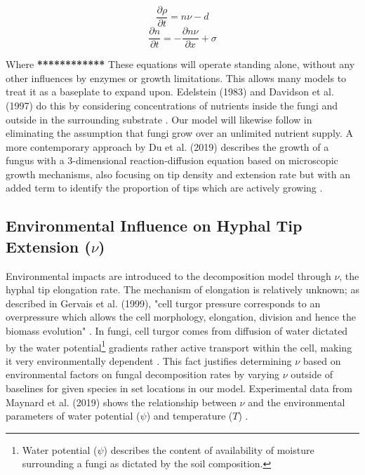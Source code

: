 \documentclass[12pt]{article}
\begin{document}
\begin{multicols}{2}
\begin{equation} \label{eq:1}
\frac{\partial \rho}{\partial t} = n\nu - d
\end{equation}
\begin{equation} \label{eq:2}
\frac{\partial n}{\partial t} = -\frac{\partial n\nu}{\partial x} + \sigma
\end{equation}

Where \textbf{************} These equations will operate standing alone, without any other influences by enzymes or growth limitations. This allows many models to treat it as a baseplate to expand upon. Edelstein (1983) and Davidson et al. (1997) do this by considering concentrations of nutrients inside the fungi and outside in the surrounding substrate \cite{Edelstein1983, Davidson2012}. Our model will likewise follow in eliminating the assumption that fungi grow over an unlimited nutrient supply. A more contemporary approach by Du et al. (2019) describes the growth of a fungus with a 3-dimensional reaction-diffusion equation based on microscopic growth mechanisms, also focusing on tip density and extension rate but with an added term to identify the proportion of tips which are actively growing \cite{Du2019}.

\subsection{Environmental Influence on Hyphal Tip Extension ($\nu$)}
Environmental impacts are introduced to the decomposition model through $\nu$, the hyphal tip elongation rate. The mechanism of elongation is relatively unknown; as described in Gervais et al. (1999), "cell turgor pressure corresponds to an overpressure which allows the cell morphology, elongation, division and hence the biomass evolution" \cite{Gervais1999, Steinberg2007}. In fungi, cell turgor comes from diffusion of water dictated by the water potential\footnote{Water potential ($\psi$) describes the content of availability of moisture surrounding a fungi as dictated by the soil composition.} gradients rather active transport within the cell, making it very environmentally dependent \cite{Gervais1999}. This fact justifies determining $\nu$ based on environmental factors on fungal decomposition rates by varying $\nu$ outside of baselines for given species in set locations in our model. Experimental data from Maynard et al. (2019) shows the relationship between $\nu$ and the environmental parameters of water potential ($\psi$) and temperature ($T$) \cite{Maynard2019}.


\end{multicols}
\end{document}
